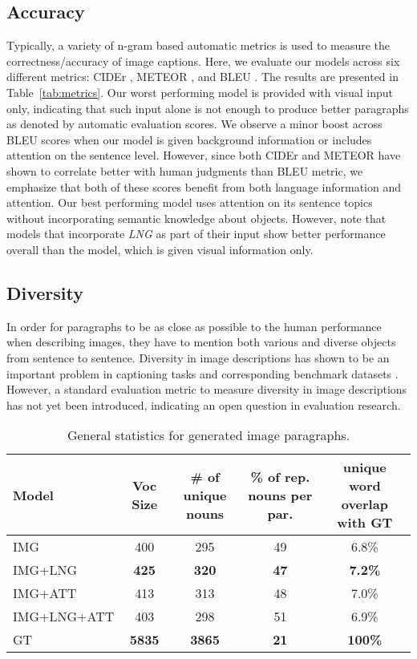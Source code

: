 \documentclass[11pt,a4paper]{article}
\begin{document}
\subsection{Accuracy}
Typically, a variety of n-gram based automatic metrics is used to measure the correctness/accuracy of image captions.
Here, we evaluate our models across six different metrics: CIDEr \cite{vedantam2014cider}, METEOR \cite{meteor14}, and BLEU \cite{bleu}.
The results are presented in Table~\ref{tab:metrics}.
Our worst performing model is provided with visual input only, indicating that such input alone is not enough to produce better paragraphs as denoted by automatic evaluation scores.
We observe a minor boost across BLEU scores when our model is given background information or includes attention on the sentence level.
However, since both CIDEr and METEOR have shown to correlate better with human judgments than BLEU metric, we emphasize that both of these scores benefit from both language information and attention.
Our best performing model uses attention on its sentence topics without incorporating semantic knowledge about objects.
However, note that models that incorporate \textit{LNG} as part of their input show better performance overall than the model, which is given visual information only.

\subsection{Diversity}
In order for paragraphs to be as close as possible to the human performance when describing images, they have to mention both various and diverse objects from sentence to sentence.
Diversity in image descriptions has shown to be an important problem in captioning tasks and corresponding benchmark datasets \cite{devlin2015language,lindh_generating_2018}.
However, a standard evaluation metric to measure diversity in image descriptions has not yet been introduced, indicating an open question in evaluation research.

\begin{table*}[]
    \footnotesize
    \centering
    \begin{tabular}{|l|c|c|c|c|}
    \hline
       \textbf{Model}  &  \textbf{Voc Size} & \textbf{\# of unique nouns} & \textbf{\% of rep. nouns per par.} & \textbf{unique word overlap with GT} \\
    \hline
      IMG   & 400 & 295 & 49 & 6.8\% \\
    \hline
      IMG+LNG   & \textbf{425} & \textbf{320} & \textbf{47} & \textbf{7.2\%} \\
    \hline
      IMG+ATT   & 413 & 313 & 48 & 7.0\% \\
    \hline
      IMG+LNG+ATT   & 403 & 298 & 51 & 6.9\% \\
    \hline
    \hline
      GT & \textbf{5835} & \textbf{3865} & \textbf{21} & \textbf{100\%} \\
    \hline
    \end{tabular}
    \caption{General statistics for generated image paragraphs.}
    \label{tab:stats}
\end{table*}
\end{document}
